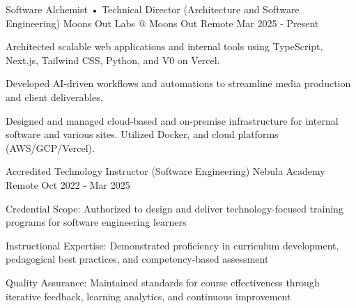 

\begin{cventries}

  \cventry
    {Software Alchemist • Technical Director (Architecture and Software Engineering)} %
    {Moons Out Labs @ Moons Out} %
    {Remote} %
    {Mar 2025 - Present} %
    {
      \begin{cvitems} %
        \item {Architected scalable web applications and internal tools using TypeScript, Next.js, Tailwind CSS, Python, and V0 on Vercel.}
        \item {Developed AI-driven workflows and automations to streamline media production and client deliverables.}
        \item {Designed and managed cloud-based and on-premise infrastructure for internal software and various sites. Utilized Docker, and cloud platforms (AWS/GCP/Vercel).}
      \end{cvitems}
    }

  \cventry
    {Accredited Technology Instructor (Software Engineering)} %
    {Nebula Academy} %
    {Remote} %
    {Oct 2022 - Mar 2025} %
    {
      \begin{cvitems} %
        \item {Credential Scope: Authorized to design and deliver technology-focused training programs for software engineering learners}
        \item {Instructional Expertise: Demonstrated proficiency in curriculum development, pedagogical best practices, and competency-based assessment}
        \item {Quality Assurance: Maintained standards for course effectiveness through iterative feedback, learning analytics, and continuous improvement}
      \end{cvitems}
    }



\end{cventries}
